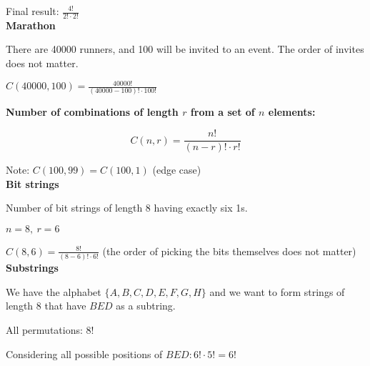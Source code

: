 \documentclass{exam}
\begin{document}
    Final result: $\frac{4!}{2! \cdot 2!}$\\
    
    \textbf{Marathon}
    
    There are 40000 runners, and 100 will be invited to an event. The order of invites does not matter.
    
    $C(40000,100) = \frac{40000!}{(40000 - 100)! \cdot 100!}$\\
    \newpage
    
    \textbf{Number of combinations of length $r$ from a set of $n$ elements:}
    
    $$C(n,r) = \frac{n!}{(n-r)! \cdot r!}$$
    
    Note: $C(100,99) = C(100,1)$ (edge case)\\
    
    \textbf{Bit strings}
    
    Number of bit strings of length 8 having exactly six 1s.
    
    $n = 8,\ r = 6$
    
    $C(8,6) = \frac{8!}{(8-6)! \cdot 6!}$ (the order of picking the bits themselves does not matter)\\
    
    \textbf{Substrings}
    
    We have the alphabet $\{A,B,C,D,E,F,G,H\}$ and we want to form strings of length 8 that have $BED$ as a subtring.
    
    All permutations: $8!$
    
    Considering all possible positions of $BED: 6! \cdot 5! = 6!$
    
    
\end{document}
